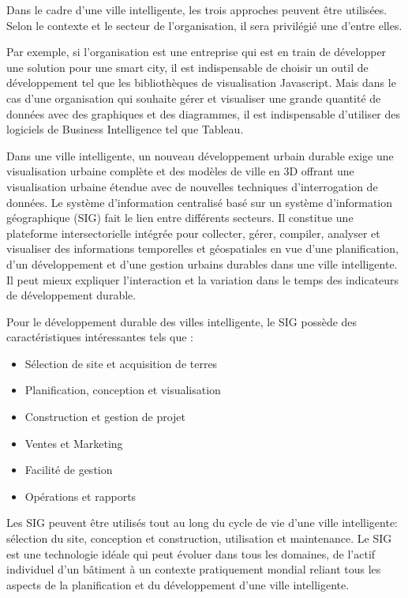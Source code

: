 \documentclass[french, a4paper, 12pt]{report}
\begin{document}
Dans le cadre d’une ville intelligente, les trois approches peuvent être utilisées. Selon le contexte et le secteur de l’organisation, il sera privilégié une d’entre elles. 

Par exemple, si l’organisation est une entreprise qui est en train de développer une solution pour une smart city, il est indispensable de choisir un outil de développement tel que les bibliothèques de visualisation Javascript. Mais dans le cas d’une organisation qui souhaite gérer et visualiser une grande quantité de données avec des graphiques et des diagrammes, il est indispensable d’utiliser des logiciels de Business Intelligence tel que Tableau. 

Dans une ville intelligente, un nouveau développement urbain durable exige une visualisation urbaine complète et des modèles de ville en 3D offrant une visualisation urbaine étendue avec de nouvelles techniques d'interrogation de données. Le système d’information centralisé basé sur un système d’information géographique (SIG) fait le lien entre différents secteurs. Il constitue une plateforme intersectorielle intégrée pour collecter, gérer, compiler, analyser et visualiser des informations temporelles et géospatiales en vue d’une planification, d’un développement et d’une gestion urbains durables dans une ville intelligente. Il peut mieux expliquer l'interaction et la variation dans le temps des indicateurs de développement durable. 

Pour le développement durable des villes intelligente, le SIG possède des
caractéristiques intéressantes tels que : 
\begin{itemize}
  \item Sélection de site et acquisition de terres
  \item Planification, conception et visualisation
  \item Construction et gestion de projet
  \item Ventes et Marketing
  \item Facilité de gestion
  \item Opérations et rapports
\end{itemize}

Les SIG peuvent être utilisés tout au long du cycle de vie d'une ville intelligente: sélection du site, conception et construction, utilisation et maintenance. Le SIG est une technologie idéale qui peut évoluer dans tous les domaines, de l'actif individuel d'un bâtiment à un contexte pratiquement mondial reliant tous les aspects de la planification et du développement d'une ville intelligente.
\end{document}
